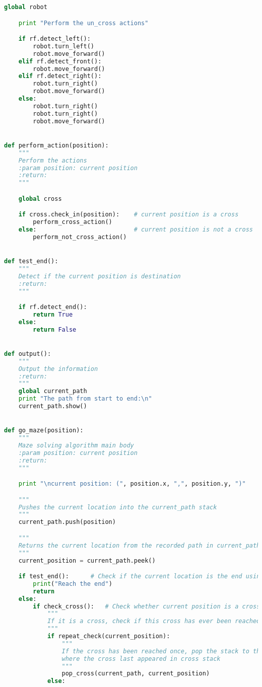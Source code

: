 \documentclass[11pt,times,oneside,openright,hardcopy]{eeereport}
\begin{document}
\begin{lstlisting}[language=Python]
    global robot

    print "Perform the un_cross actions"

    if rf.detect_left():
        robot.turn_left()
        robot.move_forward()
    elif rf.detect_front():
        robot.move_forward()
    elif rf.detect_right():
        robot.turn_right()
        robot.move_forward()
    else:
        robot.turn_right()
        robot.turn_right()
        robot.move_forward()


def perform_action(position):
    """
    Perform the actions
    :param position: current position
    :return:
    """

    global cross

    if cross.check_in(position):    # current position is a cross
        perform_cross_action()
    else:                           # current position is not a cross
        perform_not_cross_action()


def test_end():
    """
    Detect if the current position is destination
    :return:
    """

    if rf.detect_end():
        return True
    else:
        return False


def output():
    """
    Output the information
    :return:
    """
    global current_path
    print "The path from start to end:\n"
    current_path.show()


def go_maze(position):
    """
    Maze solving algorithm main body
    :param position: current position
    :return:
    """

    print "\ncurrent position: (", position.x, ",", position.y, ")"

    """
    Pushes the current location into the current_path stack
    """
    current_path.push(position)

    """
    Returns the current location from the recorded path in current_path stack
    """
    current_position = current_path.peek()

    if test_end():      # Check if the current location is the end using infrared sensors
        print("Reach the end")
        return
    else:
        if check_cross():   # Check whether current position is a cross using ultrasonic sensors
            """
            If it is a cross, check if this cross has ever been reached
            """
            if repeat_check(current_position):
                """
                If the cross has been reached once, pop the stack to the place 
                where the cross last appeared in cross stack
                """
                pop_cross(current_path, current_position)
            else:


\end{lstlisting}
\end{document}
